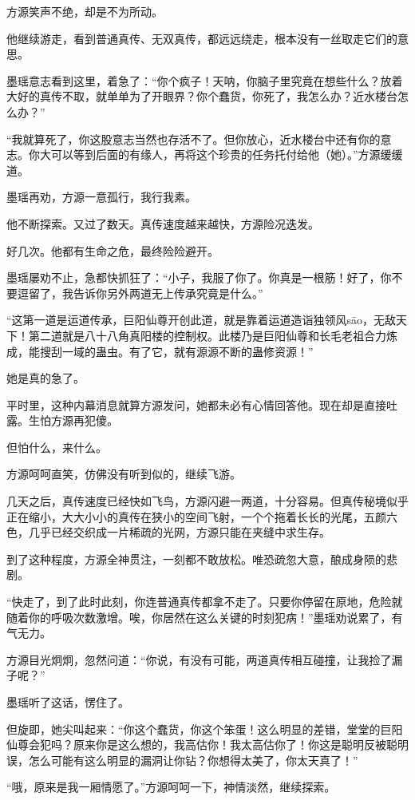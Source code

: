 \begin{this_body}
方源笑声不绝，却是不为所动。

他继续游走，看到普通真传、无双真传，都远远绕走，根本没有一丝取走它们的意思。

墨瑶意志看到这里，着急了：“你个疯子！天呐，你脑子里究竟在想些什么？放着大好的真传不取，就单单为了开眼界？你个蠢货，你死了，我怎么办？近水楼台怎么办？”

“我就算死了，你这股意志当然也存活不了。但你放心，近水楼台中还有你的意志。你大可以等到后面的有缘人，再将这个珍贵的任务托付给他（她）。”方源缓缓道。

墨瑶再劝，方源一意孤行，我行我素。

他不断探索。又过了数天。真传速度越来越快，方源险况迭发。

好几次。他都有生命之危，最终险险避开。

墨瑶屡劝不止，急都快抓狂了：“小子，我服了你了。你真是一根筋！好了，你不要逗留了，我告诉你另外两道无上传承究竟是什么。”

“这第一道是运道传承，巨阳仙尊开创此道，就是靠着运道造诣独领风sāo，无敌天下！第二道就是八十八角真阳楼的控制权。此楼乃是巨阳仙尊和长毛老祖合力炼成，能搜刮一域的蛊虫。有了它，就有源源不断的蛊修资源！”

她是真的急了。

平时里，这种内幕消息就算方源发问，她都未必有心情回答他。现在却是直接吐露。生怕方源再犯傻。

但怕什么，来什么。

方源呵呵直笑，仿佛没有听到似的，继续飞游。

几天之后，真传速度已经快如飞鸟，方源闪避一两道，十分容易。但真传秘境似乎正在缩小，大大小小的真传在狭小的空间飞射，一个个拖着长长的光尾，五颜六色，几乎已经交织成一片稀疏的光网，方源只能在夹缝中求生存。

到了这种程度，方源全神贯注，一刻都不敢放松。唯恐疏忽大意，酿成身陨的悲剧。

“快走了，到了此时此刻，你连普通真传都拿不走了。只要你停留在原地，危险就随着你的呼吸次数激增。唉，你居然在这么关键的时刻犯病！”墨瑶劝说累了，有气无力。

方源目光炯炯，忽然问道：“你说，有没有可能，两道真传相互碰撞，让我捡了漏子呢？”

墨瑶听了这话，愣住了。

但旋即，她尖叫起来：“你这个蠢货，你这个笨蛋！这么明显的差错，堂堂的巨阳仙尊会犯吗？原来你是这么想的，我高估你！我太高估你了！你这是聪明反被聪明误，怎么可能有这么明显的漏洞让你钻？你想得太美了，你太天真了！”

“哦，原来是我一厢情愿了。”方源呵呵一下，神情淡然，继续探索。


\end{this_body}
